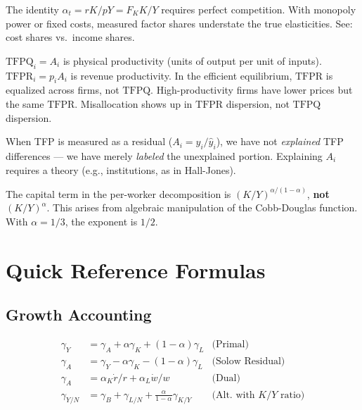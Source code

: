 \documentclass[a4paper,11pt]{article}
\newcommand{\TFPR}{\mathrm{TFPR}}
\newcommand{\TFPQ}{\mathrm{TFPQ}}
\newcommand{\gA}{\gamma_{A}}
\newcommand{\gY}{\gamma_{Y}}
\newcommand{\gK}{\gamma_{K}}
\newcommand{\gL}{\gamma_{L}}
\begin{document}
\begin{pitfallbox}[title={Pitfall 4: Factor Shares $\neq$ Output Elasticities Under Market Power}]
The identity $\alpha_t = rK/pY = F_K K/Y$ requires perfect competition. With monopoly power or fixed costs, measured factor shares understate the true elasticities. See: cost shares vs.\ income shares.
\end{pitfallbox}

\begin{pitfallbox}[title={Pitfall 5: TFPQ vs.\ TFPR Confusion}]
$\TFPQ_i = A_i$ is physical productivity (units of output per unit of inputs). $\TFPR_i = p_i A_i$ is revenue productivity. In the efficient equilibrium, $\TFPR$ is equalized across firms, not $\TFPQ$. High-productivity firms have lower prices but the same $\TFPR$. Misallocation shows up in $\TFPR$ dispersion, not $\TFPQ$ dispersion.
\end{pitfallbox}

\begin{pitfallbox}[title={Pitfall 6: Development Accounting Residual Is NOT ``Explained''}]
When TFP is measured as a residual ($A_i = y_i / \hat{y}_i$), we have not \textit{explained} TFP differences --- we have merely \textit{labeled} the unexplained portion. Explaining $A_i$ requires a theory (e.g., institutions, as in Hall-Jones).
\end{pitfallbox}

\begin{pitfallbox}[title={Pitfall 7: Forgetting $\alpha/(1-\alpha)$ Exponent in HJ Decomposition}]
The capital term in the per-worker decomposition is $(K/Y)^{\alpha/(1-\alpha)}$, \textbf{not} $(K/Y)^\alpha$. This arises from algebraic manipulation of the Cobb-Douglas function. With $\alpha = 1/3$, the exponent is $1/2$.
\end{pitfallbox}

\clearpage

\section{Quick Reference Formulas}

\subsection*{Growth Accounting}
\begin{align*}
\gY &= \gA + \alpha \gK + (1-\alpha)\gL & \text{(Primal)} \\
\gA &= \gY - \alpha \gK - (1-\alpha)\gL & \text{(Solow Residual)} \\
\gA &= \alpha_K \dot{r}/r + \alpha_L \dot{w}/w & \text{(Dual)} \\
\gamma_{Y/N} &= \gamma_B + \gamma_{L/N} + \tfrac{\alpha}{1-\alpha}\gamma_{K/Y} & \text{(Alt. with $K/Y$ ratio)}
\end{align*}
\end{document}
